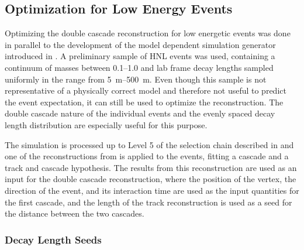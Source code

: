 \subsection{Optimization for Low Energy Events}

Optimizing the double cascade reconstruction for low energetic events was done in parallel to the development of the model dependent simulation generator introduced in . A preliminary sample of HNL events was used, containing a continuum of masses between \SIrange[range-phrase=~and~]{0.1}{1.0}{\gev} and lab frame decay lengths sampled uniformly in the range from \SIrange{5}{500}{\meter}. Even though this sample is not representative of a physically correct model and therefore not useful to predict the event expectation, it can still be used to optimize the reconstruction. The double cascade nature of the individual events and the evenly spaced decay length distribution are especially useful for this purpose.

The simulation is processed up to Level 5 of the selection chain described in  and one of the reconstructions from  is applied to the events, fitting a cascade and a track and cascade hypothesis. The results from this reconstruction are used as an input for the double cascade reconstruction, where the position of the vertex, the direction of the event, and its interaction time are used as the input quantities for the first cascade, and the length of the track reconstruction is used as a seed for the distance between the two cascades.


\subsubsection{Decay Length Seeds}

